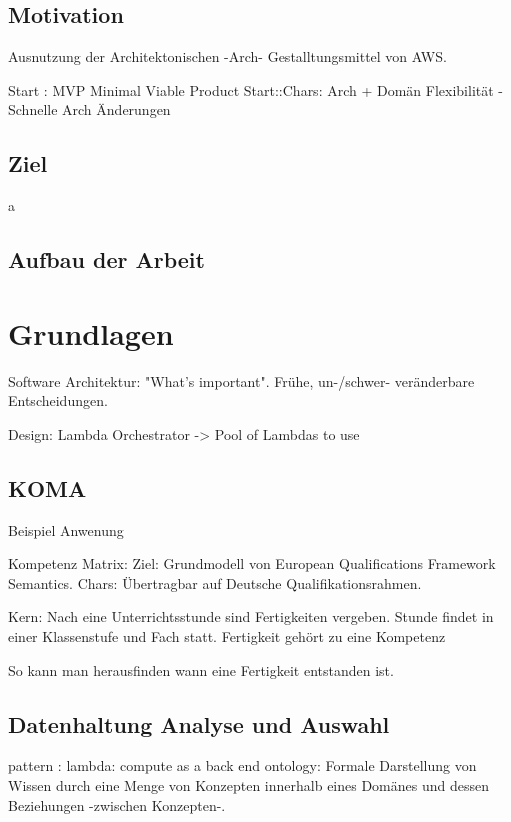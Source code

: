 \documentclass[
12pt,
english,
ngerman,
headsepline,
twoside,
openright,
numbers=noenddot,version=first
]{scrreprt}
\begin{document}
\section{Motivation}
Ausnutzung der Architektonischen -Arch- Gestalltungsmittel von AWS.

Start : MVP Minimal Viable Product  
Start::Chars: Arch + Domän Flexibilität - Schnelle Arch Änderungen

\section{Ziel}
\label{sec:task}
a

\section{Aufbau der Arbeit}
\label{sec:layout}

\chapter{Grundlagen}
\label{chap:principles}
Software Architektur: "What's important". Frühe, un-/schwer- veränderbare Entscheidungen.

Design: Lambda Orchestrator -> Pool of Lambdas to use

\section{KOMA}{Beispiel Anwenung}


Kompetenz Matrix:
Ziel: Grundmodell von \glqq European Qualifications Framework \grqq Semantics.
Chars: Übertragbar auf Deutsche Qualifikationsrahmen.

Kern: Nach eine Unterrichtsstunde sind Fertigkeiten vergeben.
Stunde findet in einer Klassenstufe und Fach statt.
Fertigkeit gehört zu eine Kompetenz

So kann man herausfinden wann eine Fertigkeit entstanden ist.


\section{Datenhaltung Analyse und Auswahl}
pattern : lambda: compute as a back end 
ontology: Formale Darstellung von Wissen durch eine Menge von Konzepten innerhalb eines Domänes und dessen Beziehungen -zwischen Konzepten-.
\end{document}
